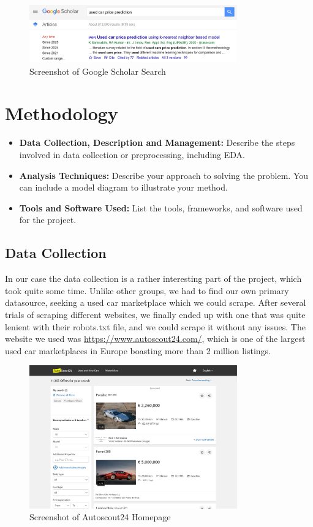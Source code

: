 \documentclass[12pt]{article}
\begin{document}
\begin{figure}[ht]
  \centering
  \includegraphics[width=0.8\textwidth]{./images/google_scholar.png}
  \caption{Screenshot of Google Scholar Search}
  \label{fig:google_scholar}
\end{figure}

\section{Methodology}
\begin{itemize}
    \item \textbf{Data Collection, Description and Management:} Describe the steps involved in data collection or preprocessing, including EDA.
    \item \textbf{Analysis Techniques:} Describe your approach to solving the problem. You can include a model diagram to illustrate your method.
    \item \textbf{Tools and Software Used:} List the tools, frameworks, and software used for the project.
\end{itemize}
\subsection{Data Collection}
In our case the data collection is a rather interesting part of the project, which took quite some time. Unlike other groups, we had to find our own primary datasource, seeking a used car marketplace which we could scrape.
After several trials of scraping different websites, we finally ended up with one that was quite lenient with their robots.txt file, and we could scrape it without any issues. The website we used was \url{https://www.autoscout24.com/}, which is one of the largest used car marketplaces in Europe boasting more than 2 million listings.

\begin{figure}[ht]
  \centering
  \includegraphics[width=0.8\textwidth]{./images/autoscout.png}
  \caption{Screenshot of Autoscout24 Homepage}
  \label{fig:autoscout}
\end{figure}
\end{document}
